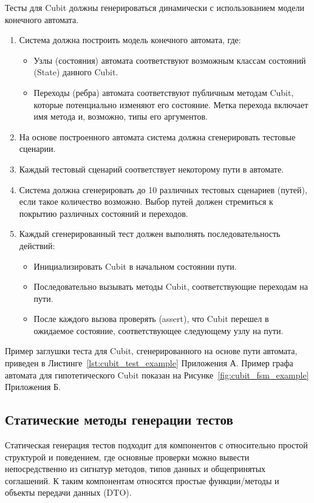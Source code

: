 \documentclass[14pt, russian]{scrartcl}
\begin{document}
Тесты для Cubit должны генерироваться динамически с использованием модели конечного автомата.
\begin{enumerate}
    \item Система должна построить модель конечного автомата, где:
        \begin{itemize}
            \item Узлы (состояния) автомата соответствуют возможным классам состояний (State) данного Cubit.
            \item Переходы (ребра) автомата соответствуют публичным методам Cubit, которые потенциально изменяют его состояние. Метка перехода включает имя метода и, возможно, типы его аргументов.
        \end{itemize}
    \item На основе построенного автомата система должна сгенерировать тестовые сценарии.
    \item Каждый тестовый сценарий соответствует некоторому пути в автомате.
    \item Система должна сгенерировать до 10 различных тестовых сценариев (путей), если такое количество возможно. Выбор путей должен стремиться к покрытию различных состояний и переходов.
    \item Каждый сгенерированный тест должен выполнять последовательность действий:
        \begin{itemize}
            \item Инициализировать Cubit в начальном состоянии пути.
            \item Последовательно вызывать методы Cubit, соответствующие переходам на пути.
            \item После каждого вызова проверять (assert), что Cubit перешел в ожидаемое состояние, соответствующее следующему узлу на пути.
        \end{itemize}
\end{enumerate}
Пример заглушки теста для Cubit, сгенерированного на основе пути автомата, приведен в Листинге~\ref{lst:cubit_test_example} Приложения А. Пример графа автомата для гипотетического Cubit показан на Рисунке~\ref{fig:cubit_fsm_example} Приложения Б.

\subsection{Статические методы генерации тестов}

Статическая генерация тестов подходит для компонентов с относительно простой структурой и поведением, где основные проверки можно вывести непосредственно из сигнатур методов, типов данных и общепринятых соглашений. К таким компонентам относятся простые функции/методы и объекты передачи данных (DTO).
\end{document}
